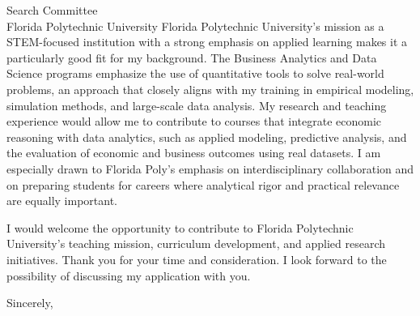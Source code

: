 \documentclass[11pt,letterpaper]{letter}
\begin{document}
\begin{letter}{Search Committee \\
Florida Polytechnic University}
Florida Polytechnic University’s mission as a STEM-focused institution with a strong emphasis on applied learning makes it a particularly good fit for my background. The Business Analytics and Data Science programs emphasize the use of quantitative tools to solve real-world problems, an approach that closely aligns with my training in empirical modeling, simulation methods, and large-scale data analysis. My research and teaching experience would allow me to contribute to courses that integrate economic reasoning with data analytics, such as applied modeling, predictive analysis, and the evaluation of economic and business outcomes using real datasets. I am especially drawn to Florida Poly’s emphasis on interdisciplinary collaboration and on preparing students for careers where analytical rigor and practical relevance are equally important.

I would welcome the opportunity to contribute to Florida Polytechnic University’s teaching mission, curriculum development, and applied research initiatives. Thank you for your time and consideration. I look forward to the possibility of discussing my application with you.

\closing{Sincerely,}

\end{letter}
\end{document}
